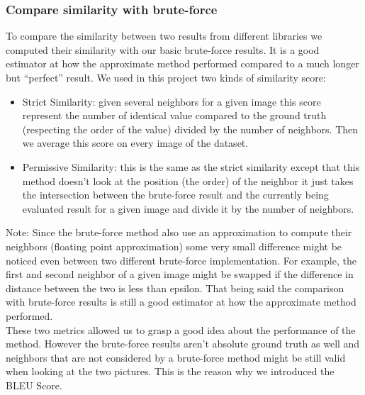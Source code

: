 \documentclass[a4paper]{article}
\begin{document}
	\subsubsection{Compare similarity with brute-force}
		To compare the similarity between two results from different libraries we computed their similarity with our basic brute-force results. It is a good estimator at how the approximate method performed compared to a much longer but “perfect” result. We used in this project two kinds of similarity score:
		\begin{itemize}
			\item Strict Similarity: given several neighbors for a given image this score represent the number of identical value compared to the ground truth (respecting the order of the value) divided by the number of neighbors. Then we average this score on every image of the dataset.
			\item Permissive Similarity: this is the same as the strict similarity except that this method doesn't look at the position (the order) of the neighbor it just takes the intersection between the brute-force result and the currently being evaluated result for a given image and divide it by the number of neighbors.
		\end{itemize}

Note: Since the brute-force method also use an approximation to compute their neighbors (floating point approximation) some very small difference might be noticed even between two different brute-force implementation. For example, the first and second neighbor of a given image might be swapped if the difference in distance between the two is less than epsilon. That being said the comparison with brute-force results is still a good estimator at how the approximate method performed.\\

These two metrics allowed us to grasp a good idea about the performance of the method. However the brute-force results aren't absolute ground truth as well and neighbors that are not considered by a brute-force method might be still valid when looking at the two pictures. This is the reason why we introduced the BLEU Score.
\end{document}
